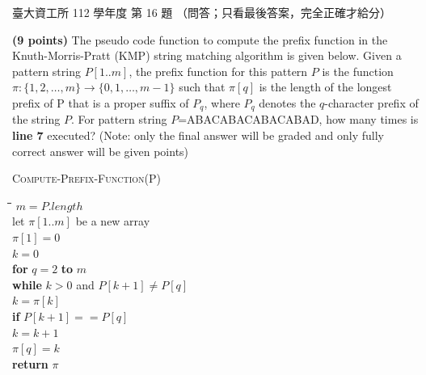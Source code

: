 \begin{pastexam}[label={px:ntu-112-dsa-16}]{臺大資工所 112 學年度 第 16 題}
（問答；只看最後答案，完全正確才給分）

\textbf{(9 points)} The pseudo code function to compute the prefix function in the
Knuth-Morris-Pratt (KMP) string matching algorithm is given below. Given a pattern string
$P[1..m]$, the prefix function for this pattern $P$ is the function
$\pi:\{1,2,\ldots,m\}\to\{0,1,\ldots,m-1\}$ such that $\pi[q]$ is the length of the longest prefix
of P that is a proper suffix of $P_q$, where $P_q$ denotes the $q$-character prefix of the string
$P$. For pattern string $P$=ABACABACABACABAD, how many times is \textbf{line 7} executed? (Note:
only the final answer will be graded and only fully correct answer will be given points)

\smallskip
\textsc{Compute-Prefix-Function}(P)
\begin{tabbing}
\hspace{2em}\=\hspace{2em}\=\hspace{2em}\=\hspace{2em}\=\kill
{}\>$m = P.\mathit{length}$\\
\>let $\pi[1..m]$ be a new array\\
\>$\pi[1] = 0$\\
\>$k = 0$\\
\>\textbf{for} $q = 2$ \textbf{to} $m$\\
\>\>\textbf{while} $k > 0$ and $P[k+1] \ne P[q]$\\
\>\>\>$k = \pi[k]$\\
\>\>\textbf{if} $P[k+1] == P[q]$\\
\>\>\>$k = k+1$\\
\>\>$\pi[q] = k$\\
\>\textbf{return} $\pi$
\end{tabbing}
\end{pastexam}


